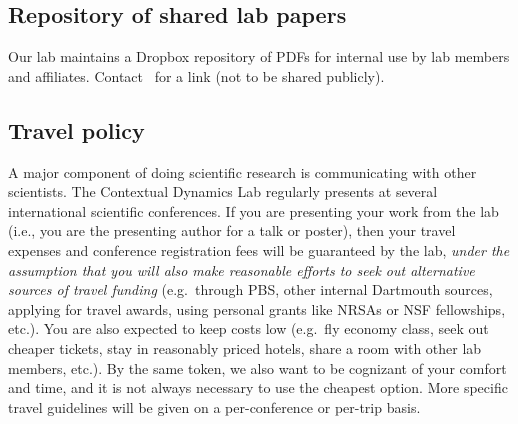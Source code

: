 \documentclass{tufte-book} %
\begin{document}
\subsection{Repository of shared lab papers}
Our lab maintains a Dropbox repository of PDFs for internal use by lab
members and affiliates. Contact \director~for a link (not to be shared
publicly).

 \subsection{Travel policy}
 A major component of doing scientific
 research is communicating with other scientists.  The Contextual
 Dynamics Lab regularly presents at several international scientific
 conferences.  If you are presenting your work from the lab (i.e., you
 are the presenting author for a talk or poster), then your travel
 expenses and conference registration fees will be guaranteed by the
 lab, \textit{under the assumption that you will also make reasonable
   efforts to seek out alternative sources of travel funding} (e.g.\
 through PBS, other internal Dartmouth sources, applying for travel
 awards, using personal grants like NRSAs or NSF fellowships, etc.).
 You are also expected to keep costs low (e.g.\ fly economy class,
 seek out cheaper tickets, stay in reasonably priced hotels, share a
 room with other lab members, etc.).  By the same token, we also want
 to be cognizant of your comfort and time, and it is not always
 necessary to use the cheapest option.  More specific travel
 guidelines will be given on a per-conference or per-trip basis.
\end{document}
